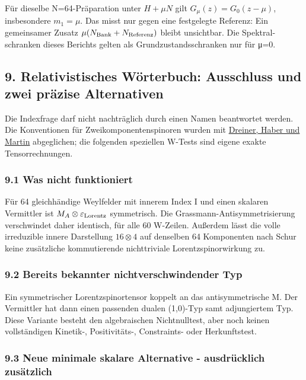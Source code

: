 Für dieselbe N=64-Präparation unter \(H+\mu N\) gilt
\(G_\mu(z)=G_0(z-\mu)\), insbesondere \(m_1=\mu\). Das misst nur gegen
eine festgelegte Referenz: Ein gemeinsamer Zusatz
\(\mu(N_{\rm Bank}+N_{\rm Referenz})\) bleibt unsichtbar. Die Spektral-
schranken dieses Berichts gelten als Grundzustandsschranken nur für μ=0.

\subsection{9. Relativistisches Wörterbuch: Ausschluss und zwei präzise
Alternativen}\label{relativistisches-wuxf6rterbuch-ausschluss-und-zwei-pruxe4zise-alternativen}

Die Indexfrage darf nicht nachträglich durch einen Namen beantwortet
werden. Die Konventionen für Zweikomponentenspinoren wurden mit
\href{https://arxiv.org/abs/0812.1594}{Dreiner, Haber und Martin}
abgeglichen; die folgenden speziellen W-Tests sind eigene exakte
Tensorrechnungen.

\subsubsection{9.1 Was nicht funktioniert}\label{was-nicht-funktioniert}

Für 64 gleichhändige Weylfelder mit innerem Index I und einen skalaren
Vermittler ist \(M_A\otimes\varepsilon_{\rm Lorentz}\) symmetrisch. Die
Grassmann-Antisymmetrisierung verschwindet daher identisch, für alle 60
W-Zeilen. Außerdem lässt die volle irreduzible innere Darstellung
\(16\otimes4\) auf denselben 64 Komponenten nach Schur keine zusätzliche
kommutierende nichttriviale Lorentzspinorwirkung zu.

\subsubsection{9.2 Bereits bekannter nichtverschwindender
Typ}\label{bereits-bekannter-nichtverschwindender-typ}

Ein symmetrischer Lorentzspinortensor koppelt an das antisymmetrische M.
Der Vermittler hat dann einen passenden dualen (1,0)-Typ samt
adjungiertem Typ. Diese Variante besteht den algebraischen
Nichtnulltest, aber noch keinen vollständigen Kinetik-, Positivitäts-,
Constraints- oder Herkunftstest.

\subsubsection{9.3 Neue minimale skalare Alternative - ausdrücklich
zusätzlich}\label{neue-minimale-skalare-alternative---ausdruxfccklich-zusuxe4tzlich}

